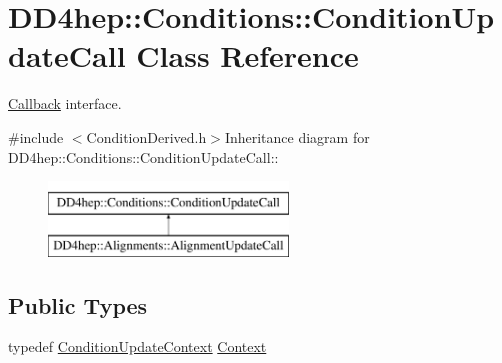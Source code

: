 \hypertarget{class_d_d4hep_1_1_conditions_1_1_condition_update_call}{
\section{DD4hep::Conditions::ConditionUpdateCall Class Reference}
\label{class_d_d4hep_1_1_conditions_1_1_condition_update_call}
}


\hyperlink{class_d_d4hep_1_1_callback}{Callback} interface.  


{\ttfamily \#include $<$ConditionDerived.h$>$}Inheritance diagram for DD4hep::Conditions::ConditionUpdateCall::\begin{figure}[H]
\begin{center}
\leavevmode
\includegraphics[height=2cm]{class_d_d4hep_1_1_conditions_1_1_condition_update_call}
\end{center}
\end{figure}
\subsection*{Public Types}
\begin{DoxyCompactItemize}
\item 
typedef \hyperlink{class_d_d4hep_1_1_conditions_1_1_condition_update_context}{ConditionUpdateContext} \hyperlink{class_d_d4hep_1_1_conditions_1_1_condition_update_call_a96b8a912f3a2ea17f139a5f5dcac7146}{Context}
\end{DoxyCompactItemize}
